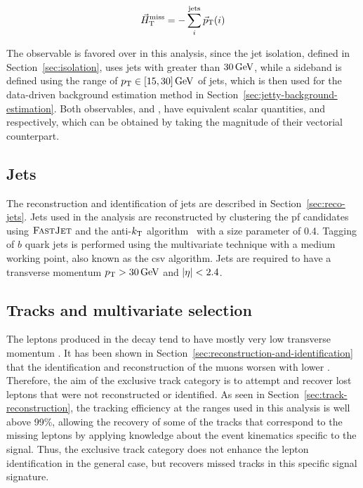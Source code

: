 \begin{equation}
\vec{H}_{\text{T}}^{\text{miss}} = -\sum_i^{\mathrm{jets}} {\vec p}_{\mathrm{T}}(i)
\end{equation}

The observable \htvecmiss is favored over \VEtmiss in this analysis, since the jet isolation, defined in Section~\ref{sec:isolation}, uses jets with \pt greater than $30\,\text{Ge\hspace{-.08em}V}$, while a sideband is defined using the range of $p_{\mathrm{T}}\in [15,30]\,\text{Ge\hspace{-.08em}V}$ of jets, which is then used for the data-driven background estimation method in Section~\ref{sec:jetty-background-estimation}. Both observables, \VEtmiss and \htvecmiss, have equivalent scalar quantities, \MET and \mht respectively, which can be obtained by taking the magnitude of their vectorial counterpart.

\subsection{Jets}
\label{subsec:jets}

The reconstruction and identification of jets are described in Section~\ref{sec:reco-jets}. Jets used in the analysis are reconstructed by clustering the \gls{pf} candidates using ${\textsc{FastJet}}$ and the anti-$k_{\mathrm{T}}$ algorithm~\cite{Cacciari_2008_antikt} with a size parameter of 0.4. Tagging of $b$ quark jets is performed using the multivariate technique \DEEPCSV with a medium working point, also known as the \gls{csv} algorithm. Jets are required to have a transverse momentum $p_{\mathrm{T}}>30\,\text{Ge\hspace{-.08em}V}$ and $\lvert \eta \rvert<2.4$.

\clearpage
\subsection{Tracks and multivariate selection }
\label{sec:track-bdt}

The leptons \ellell produced in the decay \neuttdecay tend to have mostly very low transverse momentum \pt. It has been shown in Section~\ref{sec:reconstruction-and-identification} that the identification and reconstruction of the muons worsen with lower \pt. Therefore, the aim of the exclusive track category is to attempt and recover lost leptons that were not reconstructed or identified. As seen in Section~\ref{sec:track-reconstruction}, the tracking efficiency at the \pt ranges used in this analysis is well above 99\%, allowing the recovery of some of the  tracks that correspond to the missing leptons by applying knowledge about the event kinematics specific to the signal. Thus, the exclusive track category does not enhance the lepton identification in the general case, but recovers missed tracks in this specific signal signature.

